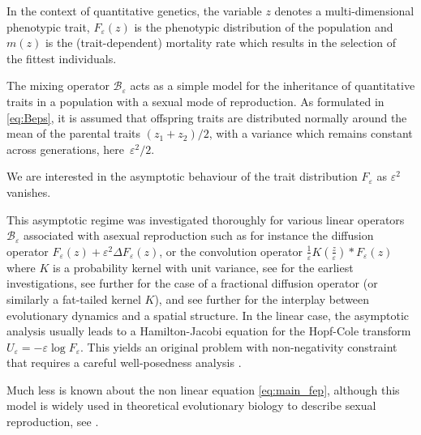 \documentclass[10pt]{amsart}
\let\mathcal\mathscr
\newcommand{\cB}{\mathcal{B}}
\theoremstyle{plain}
\theoremstyle{definition}
\let\eps\varepsilon
\begin{document}
In the context of quantitative genetics, the variable $z$ denotes a multi-dimensional phenotypic trait, $F_\eps(z)$ is the phenotypic distribution of the population and $m(z)$ is the (trait-dependent) mortality rate which results in the selection of the fittest individuals.

The mixing operator $\cB_\eps$ acts as a simple model for the inheritance of quantitative traits in a population with a sexual mode of reproduction. As formulated in \eqref{eq:Beps}, it is assumed that offspring traits are distributed normally around the mean of the parental traits $(z_1 + z_2)/2$, with a variance which remains constant across generations, here~$\eps^2/2$.

We are interested in the asymptotic behaviour of the trait distribution $F_\eps$ as $\eps^2$ vanishes.

This asymptotic regime was investigated thoroughly for various linear operators~$\cB_\eps$ associated with asexual reproduction such as for instance the diffusion operator $F_\eps(z) + \eps^2 \Delta F_\eps(z)$, or the convolution operator $\frac1\eps K(\frac z\eps)*F_\eps(z)$ where $K$ is a probability kernel with unit variance, see \cite{diekmann2005,perthame-book,barlesperthamecontemporary,
mirrahimiconcentration,
lorz2011dirac} for the earliest investigations, see further \cite{meleard_singular_2015,
mirrahimi_singular_2018,bouin_thin_2018} for the case of a fractional diffusion operator (or similarly a fat-tailed kernel $K$), and see further \cite{mirrahimi_adaptation_2013,
mirrahimi_asymptotic_2015,
bouin_hamiltonjacobi_2015,
lam_integro-pde_2017,
gandon_hamiltonjacobi_2017,
mirrahimi_hamiltonjacobi_2017, mirrahimi_evolution_2018,calvez_non-local_2018} for the interplay between evolutionary dynamics and a spatial structure. In the linear case, the asymptotic analysis usually leads to a Hamilton-Jacobi equation for the Hopf-Cole transform $U_\eps = -\eps \log F_\eps$. This yields an original problem with non-negativity constraint that requires a careful well-posedness analysis \cite{mirrahimi_class_2015,
calvez_uniqueness_2018}.

Much less is known about the non linear equation \eqref{eq:main_fep}, although this model is widely used in theoretical evolutionary biology to describe sexual reproduction, see \eg \cite{slatkin1970selection,
roughgarden1972evolution,
slatkin_niche_1976,
bulmerbook,menormal,
tufto_quantitative_2000,	
barfield_evolution_2011, huisman2012comparison,
cotto-ronce,
weberinfinitesimal,turelli_comm}.
\end{document}
